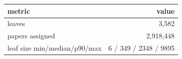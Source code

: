 \begin{tabular}{lr}
\toprule
metric & value \\
\midrule
leaves & 3,582 \\
papers assigned & 2,918,448 \\
leaf size min/median/p90/max & 6 / 349 / 2348 / 9895 \\
\bottomrule
\end{tabular}
